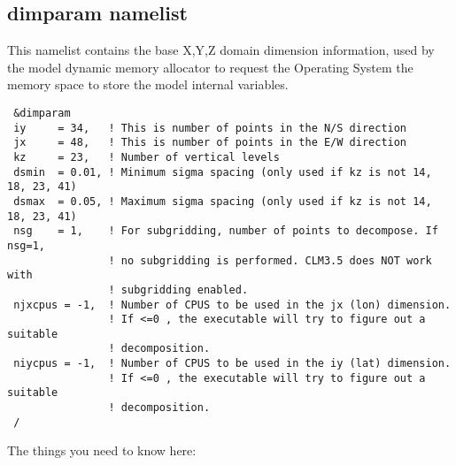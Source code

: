 \subsection{dimparam namelist}
\label{dimparam}

This namelist contains the base X,Y,Z domain dimension information, used
by the model dynamic memory allocator to request the Operating System the
memory space to store the model internal variables.

{\footnotesize
\begin{Verbatim}
 &dimparam
 iy     = 34,   ! This is number of points in the N/S direction
 jx     = 48,   ! This is number of points in the E/W direction
 kz     = 23,   ! Number of vertical levels
 dsmin  = 0.01, ! Minimum sigma spacing (only used if kz is not 14, 18, 23, 41)
 dsmax  = 0.05, ! Maximum sigma spacing (only used if kz is not 14, 18, 23, 41)
 nsg    = 1,    ! For subgridding, number of points to decompose. If nsg=1,
                ! no subgridding is performed. CLM3.5 does NOT work with
                ! subgridding enabled.
 njxcpus = -1,  ! Number of CPUS to be used in the jx (lon) dimension.
                ! If <=0 , the executable will try to figure out a suitable
                ! decomposition.
 niycpus = -1,  ! Number of CPUS to be used in the iy (lat) dimension.
                ! If <=0 , the executable will try to figure out a suitable
                ! decomposition.
 /
\end{Verbatim}
}

The things you need to know here:

